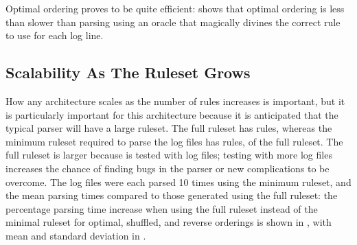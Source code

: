 Optimal ordering proves to be quite efficient:  shows that optimal ordering is less than
 slower than parsing
using an oracle that magically divines the correct rule to use for each log
line.






\FloatBarrier{}

\subsection{Scalability As The Ruleset Grows}

\label{scalability as the number of rules rises}

How any architecture scales as the number of rules increases is important,
but it is particularly important for this architecture because it is
anticipated that the typical parser will have a large ruleset.  The full
\parsername{} ruleset has \numberOFrules{} rules, whereas the minimum
ruleset required to parse the \numberOFlogFILES{} log files has
\numberOFrulesMINIMUM{} rules, \numberOFrulesMINIMUMpercentage{} of the
full ruleset.  The full ruleset is larger because \parsername{} is tested
with \numberOFlogFILESall{} log files; testing with more log files
increases the chance of finding bugs in the parser or new complications to
be overcome.  The \numberOFlogFILES{} log files were each parsed 10 times
using the minimum ruleset, and the mean parsing times compared to those
generated using the full ruleset: the percentage parsing time increase when
using the full ruleset instead of the minimal ruleset for optimal,
shuffled, and reverse orderings is shown in , with mean and standard deviation in .

